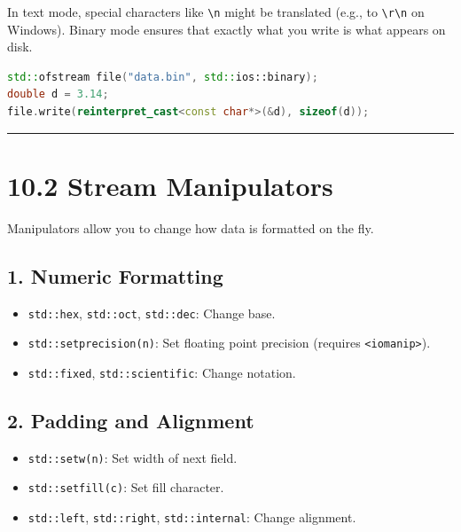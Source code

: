 In text mode, special characters like \passthrough{\lstinline!\\n!}
might be translated (e.g., to \passthrough{\lstinline!\\r\\n!} on
Windows). Binary mode ensures that exactly what you write is what
appears on disk.

\begin{lstlisting}[language={C++}]
std::ofstream file("data.bin", std::ios::binary);
double d = 3.14;
file.write(reinterpret_cast<const char*>(&d), sizeof(d));
\end{lstlisting}

\begin{center}\rule{0.5\linewidth}{0.5pt}\end{center}

\hypertarget{stream-manipulators}{%
\section{10.2 Stream Manipulators}\label{stream-manipulators}}

Manipulators allow you to change how data is formatted on the fly.

\hypertarget{numeric-formatting}{%
\subsection{1. Numeric Formatting}\label{numeric-formatting}}

\begin{itemize}
\tightlist
\item
  \passthrough{\lstinline!std::hex!},
  \passthrough{\lstinline!std::oct!},
  \passthrough{\lstinline!std::dec!}: Change base.
\item
  \passthrough{\lstinline!std::setprecision(n)!}: Set floating point
  precision (requires \passthrough{\lstinline!<iomanip>!}).
\item
  \passthrough{\lstinline!std::fixed!},
  \passthrough{\lstinline!std::scientific!}: Change notation.
\end{itemize}

\hypertarget{padding-and-alignment}{%
\subsection{2. Padding and Alignment}\label{padding-and-alignment}}

\begin{itemize}
\tightlist
\item
  \passthrough{\lstinline!std::setw(n)!}: Set width of next field.
\item
  \passthrough{\lstinline!std::setfill(c)!}: Set fill character.
\item
  \passthrough{\lstinline!std::left!},
  \passthrough{\lstinline!std::right!},
  \passthrough{\lstinline!std::internal!}: Change alignment.
\end{itemize}

